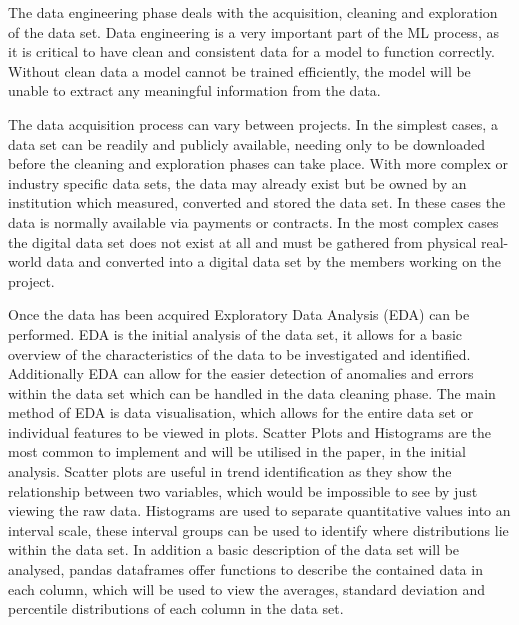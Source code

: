\documentclass{imc-inf}
\begin{document}
	The data engineering phase deals with the acquisition, cleaning and exploration of the data set. Data engineering is a very important part of the ML process, as it is critical to have clean and consistent data for a model to function correctly. Without clean data a model cannot be trained efficiently, the model will be unable to extract any meaningful information from the data. 
	\newline
	
	The data acquisition process can vary between projects. In the simplest cases, a data set can be readily and publicly available, needing only to be downloaded before the cleaning and exploration phases can take place. With more complex or industry specific data sets, the data may already exist but be owned by an institution which measured, converted and stored the data set. In these cases the data is normally available via payments or contracts. In the most complex cases the digital data set does not exist at all and must be gathered from physical real-world data and converted into a digital data set by the members working on the project. 
	\newline
	
	Once the data has been acquired Exploratory Data Analysis (EDA) can be performed. EDA is the initial analysis of the data set, it allows for a basic overview of the characteristics of the data to be investigated and identified. Additionally EDA can allow for the easier detection of anomalies and errors within the data set which can be handled in the data cleaning phase. The main method of EDA is data visualisation, which allows for the entire data set or individual features to be viewed in plots. Scatter Plots and Histograms are the most common to implement and will be utilised in the paper, in the initial analysis. Scatter plots are useful in trend identification as they show the relationship between two variables, which would be impossible to see by just viewing the raw data. Histograms are used to separate quantitative values into an interval scale, these interval groups can be used to identify where distributions lie within the data set. In addition a basic description of the data set will be analysed, pandas dataframes offer functions to describe the contained data in each column, which will be used to view the averages, standard deviation and percentile distributions of each column in the data set.
	\newline
	
\end{document}
